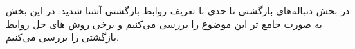 در بخش دنباله‌های بازگشتی تا حدی با تعریف روابط بازگشتی آشنا شدید, در این بخش به صورت جامع تر این موضوع را بررسی می‌کنیم و برخی روش های حل روابط بازگشتی را بررسی می‌کنیم.


